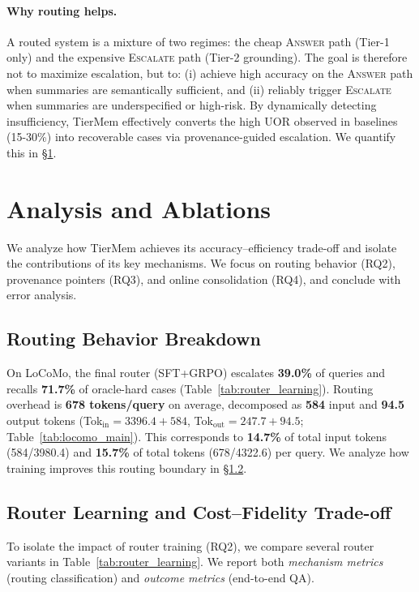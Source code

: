 \documentclass{article}
\theoremstyle{plain}
\theoremstyle{definition}
\theoremstyle{remark}
\begin{document}
\paragraph{Why routing helps.}
A routed system is a mixture of two regimes: the cheap \textsc{Answer} path (Tier-1 only) and the expensive \textsc{Escalate} path (Tier-2 grounding).
The goal is therefore not to maximize escalation, but to:
(i) achieve high accuracy on the \textsc{Answer} path when summaries are semantically sufficient,
and (ii) reliably trigger \textsc{Escalate} when summaries are underspecified or high-risk. By dynamically detecting insufficiency, TierMem effectively converts the high UOR observed in baselines (15-30\%) into recoverable cases via provenance-guided escalation.
We quantify this in \S\ref{sec:analysis_ablations}.
\section{Analysis and Ablations}
\label{sec:analysis_ablations}

We analyze how TierMem achieves its accuracy--efficiency trade-off and isolate the contributions of its key mechanisms.
We focus on routing behavior (RQ2), provenance pointers (RQ3), and online consolidation (RQ4), and conclude with error analysis.

\subsection{Routing Behavior Breakdown}
\label{sec:routing_breakdown}
On LoCoMo, the final router (SFT+GRPO) escalates \textbf{39.0\%} of queries and recalls \textbf{71.7\%} of oracle-hard cases (Table~\ref{tab:router_learning}).
Routing overhead is \textbf{678 tokens/query} on average, decomposed as \textbf{584} input and \textbf{94.5} output tokens (Tok$_{\text{in}}{=}3396.4{+}584$, Tok$_{\text{out}}{=}247.7{+}94.5$; Table~\ref{tab:locomo_main}).
This corresponds to \textbf{14.7\%} of total input tokens (584/3980.4) and \textbf{15.7\%} of total tokens (678/4322.6) per query.
We analyze how training improves this routing boundary in \S\ref{sec:router_learning}.



\subsection{Router Learning and Cost--Fidelity Trade-off}
\label{sec:router_learning}
To isolate the impact of router training (RQ2), we compare several router variants in Table~\ref{tab:router_learning}.
We report both \emph{mechanism metrics} (routing classification) and \emph{outcome metrics} (end-to-end QA).
\end{document}
